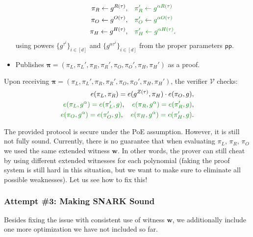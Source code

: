 \documentclass[../lecture-notes-148x210.tex]{subfiles}
\begin{document}
\begin{tcolorbox}
\begin{itemize}[label=]
\begin{align*}
            \pi_R \gets g^{R(\tau)}, & \quad\textcolor{green!50!black}{\pi_R' \gets g^{\alpha R(\tau)}} \\
            \pi_O \gets g^{O(\tau)}, & \quad\textcolor{green!50!black}{\pi_O' \gets g^{\alpha O(\tau)}} \\
            \pi_H \gets g^{H(\tau)}, & \quad\textcolor{green!50!black}{\pi_H' \gets g^{\alpha H(\tau)}}.
        \end{align*}
        using powers $\{g^{\tau^i}\}_{i \in [d]}$ and $\{g^{\alpha\tau^i}\}_{i \in [d]}$ from the proper parameters $\mathsf{pp}$.
        \item Publishes $\boldsymbol{\pi} = (\pi_L,\pi_L',\pi_R,\pi_R',\pi_O,\pi_O',\pi_H,\pi_H')$ as a proof.
    \end{itemize}
    Upon receiving $\boldsymbol{\pi} = (\pi_L,\pi_L',\pi_R,\pi_R',\pi_O,\pi_O',\pi_H,\pi_H')$, the verifier $\mathcal{V}$ checks:
    \begin{align*}
        e(\pi_L, \pi_R) = e(g^{Z(\tau)}, \pi_H) \cdot e(\pi_O, g), \\
        \textcolor{green!50!black}{e(\pi_L, g^{\alpha}) = e(\pi_L', g)}, \quad \textcolor{green!50!black}{e(\pi_R, g^{\alpha}) = e(\pi_R', g)}, \\
        \textcolor{green!50!black}{e(\pi_O, g^{\alpha}) = e(\pi_O', g)}, \quad \textcolor{green!50!black}{e(\pi_H, g^{\alpha}) = e(\pi_H', g)}.
    \end{align*}
\end{tcolorbox}

The provided protocol is secure under the PoE assumption. However, it is still not fully sound. Currently, there is no guarantee that when evaluating $\pi_L$, $\pi_R$, $\pi_O$ we used the same extended witness $\mathbf{w}$. In other words, the prover can still cheat by using different extended witnesses for each polynomial (faking the proof system is still hard in this situation, but we want to make sure to eliminate all possible weaknesses). Let us see how to fix this!

\subsubsection{Attempt \#3: Making SNARK Sound}

Besides fixing the issue with consistent use of witness $\mathbf{w}$, we additionally include one more optimization we have not included so far.
\end{document}
